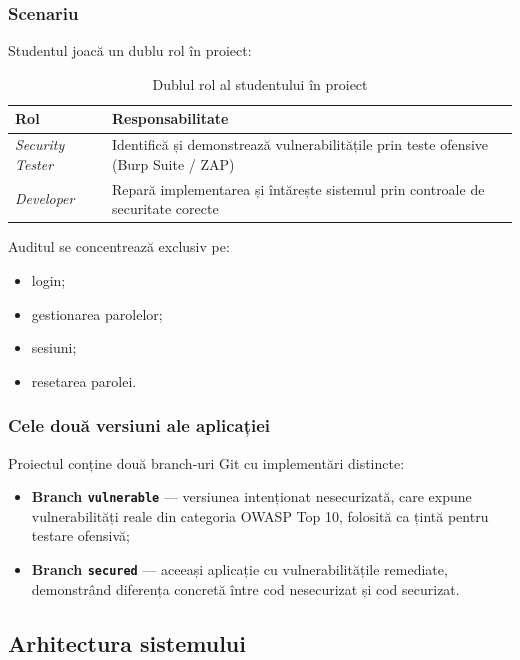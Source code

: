 \documentclass[12pt]{article}
\begin{document}
\subsubsection*{Scenariu}

Studentul joacă un dublu rol în proiect:

\begin{table}[H]
\centering
\begin{tabular}{|l|p{9cm}|}
\hline
\textbf{Rol} & \textbf{Responsabilitate} \\
\hline
\textit{Security Tester} & Identifică și demonstrează vulnerabilitățile prin teste ofensive (Burp Suite / ZAP) \\
\hline
\textit{Developer} & Repară implementarea și întărește sistemul prin controale de securitate corecte \\
\hline
\end{tabular}
\caption{Dublul rol al studentului în proiect}
\end{table}

Auditul se concentrează exclusiv pe:
\begin{itemize}
    \item login;
    \item gestionarea parolelor;
    \item sesiuni;
    \item resetarea parolei.
\end{itemize}

\subsubsection*{Cele două versiuni ale aplicației}

Proiectul conține două branch-uri Git cu implementări distincte:
\begin{itemize}
    \item \textbf{Branch \texttt{vulnerable}} --- versiunea intenționat nesecurizată, care expune
    vulnerabilități reale din categoria OWASP Top 10, folosită ca țintă pentru testare ofensivă;
    \item \textbf{Branch \texttt{secured}} --- aceeași aplicație cu vulnerabilitățile remediate,
    demonstrând diferența concretă între cod nesecurizat și cod securizat.
\end{itemize}

\subsection{Arhitectura sistemului}
\end{document}

